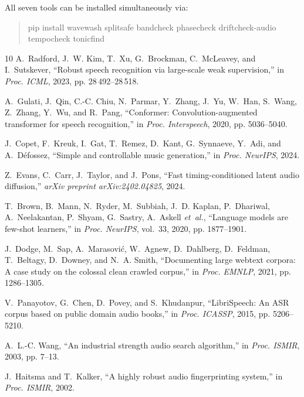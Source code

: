 \documentclass[10pt,journal,compsoc]{IEEEtran}
\begin{document}
All seven tools can be installed simultaneously via:
\begin{quote}
\footnotesize\ttfamily
pip install wavewash splitsafe bandcheck phasecheck driftcheck-audio tempocheck tonicfind
\end{quote}

\balance

\begin{thebibliography}{10}
A.~Radford, J.~W. Kim, T.~Xu, G.~Brockman, C.~McLeavey, and I.~Sutskever, ``Robust speech recognition via large-scale weak supervision,'' in \emph{Proc. ICML}, 2023, pp. 28\,492--28\,518.

A.~Gulati, J.~Qin, C.-C. Chiu, N.~Parmar, Y.~Zhang, J.~Yu, W.~Han, S.~Wang, Z.~Zhang, Y.~Wu, and R.~Pang, ``Conformer: Convolution-augmented transformer for speech recognition,'' in \emph{Proc. Interspeech}, 2020, pp. 5036--5040.

J.~Copet, F.~Kreuk, I.~Gat, T.~Remez, D.~Kant, G.~Synnaeve, Y.~Adi, and A.~D{\'e}fossez, ``Simple and controllable music generation,'' in \emph{Proc. NeurIPS}, 2024.

Z.~Evans, C.~Carr, J.~Taylor, and J.~Pons, ``Fast timing-conditioned latent audio diffusion,'' \emph{arXiv preprint arXiv:2402.04825}, 2024.

T.~Brown, B.~Mann, N.~Ryder, M.~Subbiah, J.~D. Kaplan, P.~Dhariwal, A.~Neelakantan, P.~Shyam, G.~Sastry, A.~Askell \emph{et~al.}, ``Language models are few-shot learners,'' in \emph{Proc. NeurIPS}, vol.~33, 2020, pp. 1877--1901.

J.~Dodge, M.~Sap, A.~Marasovi{\'c}, W.~Agnew, D.~Dahlberg, D.~Feldman, T.~Beltagy, D.~Downey, and N.~A. Smith, ``Documenting large webtext corpora: A case study on the colossal clean crawled corpus,'' in \emph{Proc. EMNLP}, 2021, pp. 1286--1305.

V.~Panayotov, G.~Chen, D.~Povey, and S.~Khudanpur, ``LibriSpeech: An ASR corpus based on public domain audio books,'' in \emph{Proc. ICASSP}, 2015, pp. 5206--5210.

A.~L.-C. Wang, ``An industrial strength audio search algorithm,'' in \emph{Proc. ISMIR}, 2003, pp. 7--13.

J.~Haitsma and T.~Kalker, ``A highly robust audio fingerprinting system,'' in \emph{Proc. ISMIR}, 2002.


\end{thebibliography}
\end{document}
